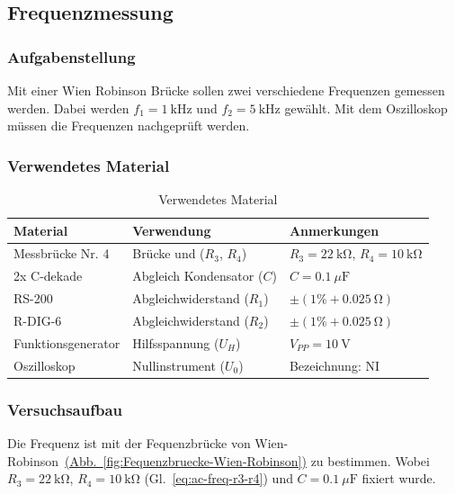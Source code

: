 \subsection{Frequenzmessung}\label{sec:3-3}
\subsubsection{Aufgabenstellung}

Mit einer Wien Robinson Brücke sollen zwei verschiedene Frequenzen gemessen werden. Dabei werden $f_1 = \SI{1}{\kilo\hertz}$ und $f_2 = \SI{5}{\kilo\hertz}$ gewählt. Mit dem Oszilloskop müssen die Frequenzen nachgeprüft werden.

\subsubsection{Verwendetes Material}

\begin{table}[h]
	\centering
	\caption{Verwendetes Material}
	\begin{tabularx}{\textwidth}{XXX}
		\textbf{Material}  & \textbf{Verwendung}        & \textbf{Anmerkungen}                               \\ \midrule
		Messbrücke Nr. 4   & Brücke und ($R_3$, $R_4$)  & $R_3=\SI{22}{\kilo\ohm}$, $R_4=\SI{10}{\kilo\ohm}$ \\
		2x C-dekade        & Abgleich Kondensator ($C$) & $C=\SI{0.1}{\mu\farad}$                            \\
		RS-200             & Abgleichwiderstand ($R_1$) & $\pm (1\% + \SI{0.025}{\ohm})$                     \\
		R-DIG-6            & Abgleichwiderstand ($R_2$) & $\pm (1\% + \SI{0.025}{\ohm})$                     \\
		Funktionsgenerator & Hilfsspannung ($U_H$)      & $V_{PP} = \SI{10}{\volt}$                          \\
		Oszilloskop        & Nullinstrument ($U_0$)     & Bezeichnung: NI                                    \\
	\end{tabularx}
\end{table}

\subsubsection{Versuchsaufbau}

Die Frequenz ist mit der Fequenzbrücke von Wien-Robinson~\hyperref[fig:Fequenzbruecke-Wien-Robinson]{(Abb.~\ref{fig:Fequenzbruecke-Wien-Robinson})} zu bestimmen. Wobei $R_3=\SI{22}{\kilo\ohm}$, $R_4=\SI{10}{\kilo\ohm}$ (Gl.~\ref{eq:ac-freq-r3-r4}) und $C = \SI{0.1}{\mu\farad}$ fixiert wurde.

